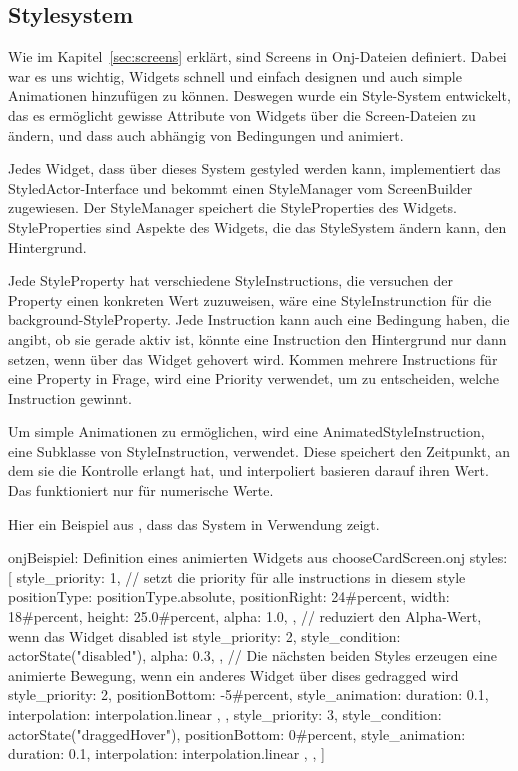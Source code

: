 
\subsection{Stylesystem}\label{subsec:stylesystem}

\renewcommand{\kapitelautor}{Autor: Marvin Kurka}

Wie im Kapitel~\ref{sec:screens} erklärt, sind Screens in Onj-Dateien definiert.
Dabei war es uns wichtig, Widgets schnell und einfach designen und auch simple Animationen hinzufügen zu können.
Deswegen wurde ein Style-System entwickelt, das es ermöglicht gewisse Attribute von Widgets über die Screen-Dateien
zu ändern, und dass auch abhängig von Bedingungen und animiert.

Jedes Widget, dass über dieses System gestyled werden kann, implementiert das StyledActor-Interface und
bekommt einen StyleManager vom ScreenBuilder zugewiesen.
Der StyleManager speichert die StyleProperties des Widgets.
StyleProperties sind Aspekte des Widgets, die das StyleSystem ändern kann, \zB den Hintergrund.

Jede StyleProperty hat verschiedene StyleInstructions, die versuchen der Property einen konkreten Wert zuzuweisen,
\zB {} wäre eine StyleInstrunction für die background-StyleProperty.
Jede Instruction kann auch eine Bedingung haben, die angibt, ob sie gerade aktiv ist, \zB könnte eine Instruction
den Hintergrund nur dann setzen, wenn über das Widget gehovert wird.
Kommen mehrere Instructions für eine Property in Frage, wird eine Priority verwendet, um zu entscheiden, welche
Instruction gewinnt.

Um simple Animationen zu ermöglichen, wird eine AnimatedStyleInstruction, eine Subklasse von StyleInstruction, verwendet.
Diese speichert den Zeitpunkt, an dem sie die Kontrolle erlangt hat, und interpoliert basieren darauf ihren Wert.
Das funktioniert nur für numerische Werte.

Hier ein Beispiel aus , dass das System in Verwendung zeigt.

\begin{codeBlock}{onj}{Beispiel: Definition eines animierten Widgets aus chooseCardScreen.onj}
styles: [
    {
        style_priority: 1, // setzt die priority für alle instructions in diesem style
        positionType: positionType.absolute,
        positionRight: 24#percent,
        width: 18#percent,
        height: 25.0#percent,
        alpha: 1.0,
    },
    {
        // reduziert den Alpha-Wert, wenn das Widget disabled ist
        style_priority: 2,
        style_condition: actorState("disabled"),
        alpha: 0.3,
    },
    // Die nächsten beiden Styles erzeugen eine animierte Bewegung, wenn ein anderes Widget über dises gedragged wird
    {
        style_priority: 2,
        positionBottom: -5#percent,
        style_animation: {
            duration: 0.1,
            interpolation: interpolation.linear
        },
    },
    {
        style_priority: 3,
        style_condition: actorState("draggedHover"),
        positionBottom: 0#percent,
        style_animation: {
            duration: 0.1,
            interpolation: interpolation.linear
        },
    },
]
\end{codeBlock}

